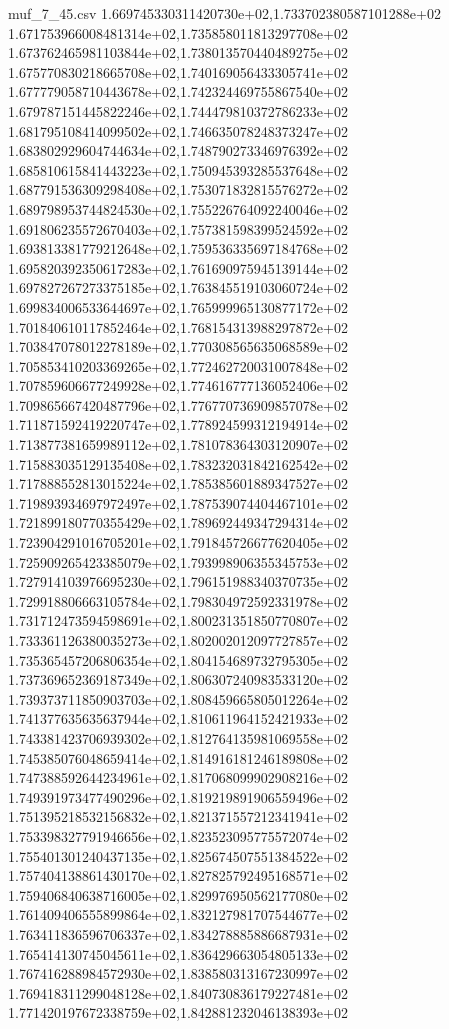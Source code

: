 \begin{filecontents*}{muf_7_45.csv}
1.669745330311420730e+02,1.733702380587101288e+02
1.671753966008481314e+02,1.735858011813297708e+02
1.673762465981103844e+02,1.738013570440489275e+02
1.675770830218665708e+02,1.740169056433305741e+02
1.677779058710443678e+02,1.742324469755867540e+02
1.679787151445822246e+02,1.744479810372786233e+02
1.681795108414099502e+02,1.746635078248373247e+02
1.683802929604744634e+02,1.748790273346976392e+02
1.685810615841443223e+02,1.750945393285537648e+02
1.687791536309298408e+02,1.753071832815576272e+02
1.689798953744824530e+02,1.755226764092240046e+02
1.691806235572670403e+02,1.757381598399524592e+02
1.693813381779212648e+02,1.759536335697184768e+02
1.695820392350617283e+02,1.761690975945139144e+02
1.697827267273375185e+02,1.763845519103060724e+02
1.699834006533644697e+02,1.765999965130877172e+02
1.701840610117852464e+02,1.768154313988297872e+02
1.703847078012278189e+02,1.770308565635068589e+02
1.705853410203369265e+02,1.772462720031007848e+02
1.707859606677249928e+02,1.774616777136052406e+02
1.709865667420487796e+02,1.776770736909857078e+02
1.711871592419220747e+02,1.778924599312194914e+02
1.713877381659989112e+02,1.781078364303120907e+02
1.715883035129135408e+02,1.783232031842162542e+02
1.717888552813015224e+02,1.785385601889347527e+02
1.719893934697972497e+02,1.787539074404467101e+02
1.721899180770355429e+02,1.789692449347294314e+02
1.723904291016705201e+02,1.791845726677620405e+02
1.725909265423385079e+02,1.793998906355345753e+02
1.727914103976695230e+02,1.796151988340370735e+02
1.729918806663105784e+02,1.798304972592331978e+02
1.731712473594598691e+02,1.800231351850770807e+02
1.733361126380035273e+02,1.802002012097727857e+02
1.735365457206806354e+02,1.804154689732795305e+02
1.737369652369187349e+02,1.806307240983533120e+02
1.739373711850903703e+02,1.808459665805012264e+02
1.741377635635637944e+02,1.810611964152421933e+02
1.743381423706939302e+02,1.812764135981069558e+02
1.745385076048659414e+02,1.814916181246189808e+02
1.747388592644234961e+02,1.817068099902908216e+02
1.749391973477490296e+02,1.819219891906559496e+02
1.751395218532156832e+02,1.821371557212341941e+02
1.753398327791946656e+02,1.823523095775572074e+02
1.755401301240437135e+02,1.825674507551384522e+02
1.757404138861430170e+02,1.827825792495168571e+02
1.759406840638716005e+02,1.829976950562177080e+02
1.761409406555899864e+02,1.832127981707544677e+02
1.763411836596706337e+02,1.834278885886687931e+02
1.765414130745045611e+02,1.836429663054805133e+02
1.767416288984572930e+02,1.838580313167230997e+02
1.769418311299048128e+02,1.840730836179227481e+02
1.771420197672338759e+02,1.842881232046138393e+02

\end{filecontents*}
